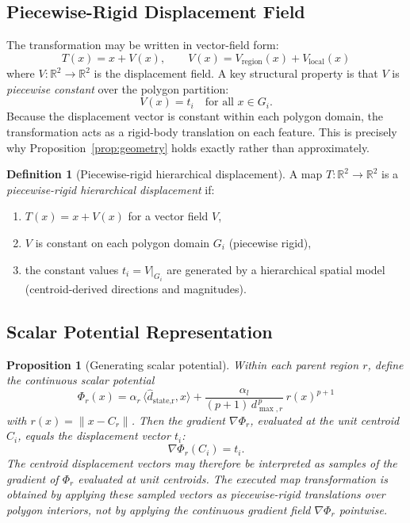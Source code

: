 \documentclass[12pt, a4paper]{article}
\numberwithin{equation}{section}
\theoremstyle{definition}
\newtheorem{definition}{Definition}[section]
\theoremstyle{plain}
\newtheorem{proposition}{Proposition}[section]
\theoremstyle{remark}
\newcommand{\R}{\mathbb{R}}
\newcommand{\norm}[1]{\left\|#1\right\|}
\newcommand{\dhat}[1]{\hat{d}_{\text{#1}}}
\newcommand{\inner}[2]{\langle #1, #2 \rangle}
\begin{document}
\subsection{Piecewise-Rigid Displacement Field}

The transformation may be written in vector-field form:
\begin{equation}
  T(x) = x + V(x), \qquad V(x) = V_{\text{region}}(x) + V_{\text{local}}(x)
  \label{eq:field}
\end{equation}
where $V: \R^2 \to \R^2$ is the displacement field. A key structural property is that $V$ is \emph{piecewise constant} over the polygon partition:
\begin{equation}
  V(x) = t_i \quad \text{for all } x \in G_i.
  \label{eq:piecewise}
\end{equation}
Because the displacement vector is constant within each polygon domain, the transformation acts as a rigid-body translation on each feature. This is precisely why Proposition~\ref{prop:geometry} holds exactly rather than approximately.

\begin{definition}[Piecewise-rigid hierarchical displacement]
A map $T: \R^2 \to \R^2$ is a \emph{piecewise-rigid hierarchical displacement} if:
\begin{enumerate}[label=(\roman*)]
  \item $T(x) = x + V(x)$ for a vector field $V$,
  \item $V$ is constant on each polygon domain $G_i$ (piecewise rigid),
  \item the constant values $t_i = V|_{G_i}$ are generated by a hierarchical spatial model (centroid-derived directions and magnitudes).
\end{enumerate}
\end{definition}


\subsection{Scalar Potential Representation}

\begin{proposition}[Generating scalar potential]
\label{prop:potential}
Within each parent region $r$, define the continuous scalar potential
\begin{equation}
  \Phi_r(x) = \alpha_r\,\inner{\dhat{state,r}}{x} + \frac{\alpha_l}{(p+1)\,d_{\max,r}^{\,p}}\,r(x)^{p+1}
  \label{eq:potential}
\end{equation}
with $r(x) = \norm{x - C_r}$. Then the gradient $\nabla\Phi_r$, evaluated at the unit centroid $C_i$, equals the displacement vector $t_i$:
\[
  \nabla\Phi_r(C_i) = t_i.
\]
The centroid displacement vectors may therefore be interpreted as samples of the gradient of $\Phi_r$ evaluated at unit centroids. The executed map transformation is obtained by applying these sampled vectors as piecewise-rigid translations over polygon interiors, \emph{not} by applying the continuous gradient field $\nabla\Phi_r$ pointwise.
\end{proposition}
\end{document}
